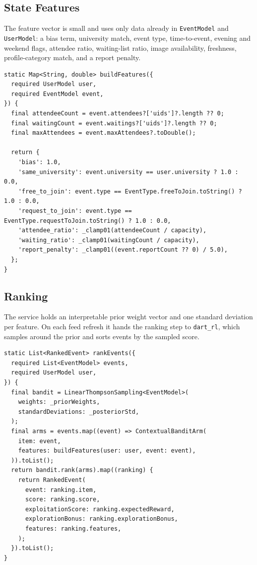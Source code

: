 \documentclass{article}
\begin{document}
\subsection{State Features}
The feature vector is small and uses only data already in \texttt{EventModel} and \texttt{UserModel}: a bias term, university match, event type, time-to-event, evening and weekend flags, attendee ratio, waiting-list ratio, image availability, freshness, profile-category match, and a report penalty.

\begin{lstlisting}
static Map<String, double> buildFeatures({
  required UserModel user,
  required EventModel event,
}) {
  final attendeeCount = event.attendees?['uids']?.length ?? 0;
  final waitingCount = event.waitings?['uids']?.length ?? 0;
  final maxAttendees = event.maxAttendees?.toDouble();

  return {
    'bias': 1.0,
    'same_university': event.university == user.university ? 1.0 : 0.0,
    'free_to_join': event.type == EventType.freeToJoin.toString() ? 1.0 : 0.0,
    'request_to_join': event.type == EventType.requestToJoin.toString() ? 1.0 : 0.0,
    'attendee_ratio': _clamp01(attendeeCount / capacity),
    'waiting_ratio': _clamp01(waitingCount / capacity),
    'report_penalty': _clamp01((event.reportCount ?? 0) / 5.0),
  };
}
\end{lstlisting}

\subsection{Ranking}
The service holds an interpretable prior weight vector and one standard deviation per feature. On each feed refresh it hands the ranking step to \texttt{dart\_rl}, which samples around the prior and sorts events by the sampled score.

\begin{lstlisting}
static List<RankedEvent> rankEvents({
  required List<EventModel> events,
  required UserModel user,
}) {
  final bandit = LinearThompsonSampling<EventModel>(
    weights: _priorWeights,
    standardDeviations: _posteriorStd,
  );
  final arms = events.map((event) => ContextualBanditArm(
    item: event,
    features: buildFeatures(user: user, event: event),
  )).toList();
  return bandit.rank(arms).map((ranking) {
    return RankedEvent(
      event: ranking.item,
      score: ranking.score,
      exploitationScore: ranking.expectedReward,
      explorationBonus: ranking.explorationBonus,
      features: ranking.features,
    );
  }).toList();
}
\end{lstlisting}
\end{document}
